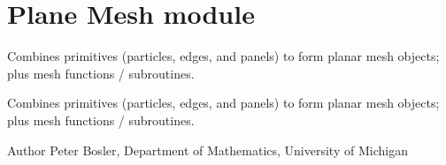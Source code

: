 \hypertarget{group___plane_mesh}{\section{Plane Mesh module}
\label{group___plane_mesh}
}


Combines primitives (particles, edges, and panels) to form planar mesh objects; plus mesh functions / subroutines.  


Combines primitives (particles, edges, and panels) to form planar mesh objects; plus mesh functions / subroutines. 

\begin{DoxyAuthor}{Author}
Peter Bosler, Department of Mathematics, University of Michigan 
\end{DoxyAuthor}
